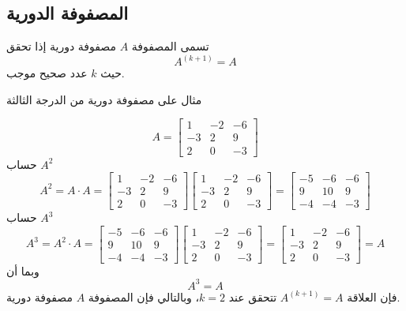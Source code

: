 	\subsection{المصفوفة الدورية}
	تسمى المصفوفة $A$ مصفوفة دورية إذا تحقق
	\[
	A^{(k+1)} = A
	\]
	حيث $k$ عدد صحيح موجب.
	\begin{example}
		مثال على مصفوفة دورية من الدرجة الثالثة
		
		\[
		A=
		\begin{bmatrix}
			1 & -2 & -6\\
			-3 & 2 & 9\\
			2 & 0 & -3
		\end{bmatrix}
		\]
		حساب \(A^2\)
		\[
		A^2 = A \cdot A =
		\begin{bmatrix}
			1 & -2 & -6\\
			-3 & 2 & 9\\
			2 & 0 & -3
		\end{bmatrix}
		\begin{bmatrix}
			1 & -2 & -6\\
			-3 & 2 & 9\\
			2 & 0 & -3
		\end{bmatrix}
		=
		\begin{bmatrix}
			-5 & -6 & -6\\
			9 & 10 & 9\\
			-4 & -4 & -3
		\end{bmatrix}
		\]
		حساب \(A^3\)
		\[
		A^3 = A^2 \cdot A =
		\begin{bmatrix}
			-5 & -6 & -6\\
			9 & 10 & 9\\
			-4 & -4 & -3
		\end{bmatrix}
		\begin{bmatrix}
			1 & -2 & -6\\
			-3 & 2 & 9\\
			2 & 0 & -3
		\end{bmatrix}
		=
		\begin{bmatrix}
			1 & -2 & -6\\
			-3 & 2 & 9\\
			2 & 0 & -3
		\end{bmatrix}
		= A
		\]
		وبما أن
		\[
		A^3 = A
		\]
		فإن العلاقة \(A^{(k+1)} = A\) تتحقق عند \(k=2\)، وبالتالي فإن المصفوفة \(A\) مصفوفة دورية.
	\end{example}
	
